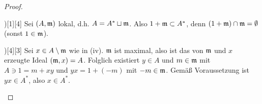 \begin{st}
\begin{proof}
\begin{seg}{\ProofImplication)[1][4]}
            Sei $(A, \mathfrak{m})$ lokal, d.h. $A = A^* \sqcup \mathfrak{m}$.
            Also $1 + \mathfrak{m} \subset A^*$, denn $(1 + \mathfrak{m}) \cap \mathfrak{m} = \emptyset$ (sonst $1 \in \mathfrak{m}$).
        \end{seg}
        \begin{seg}{\ProofImplication)[4][3]}
            Sei $x \in A \setminus \mathfrak{m}$ wie in (iv).
            $\mathfrak{m}$ ist maximal, also ist das von $\mathfrak{m}$ und $x$ erzeugte Ideal $(\mathfrak{m}, x) = A$.
            Folglich existiert $y \in A$ und $m \in \mathfrak{m}$ mit $A \ni 1 = m + xy$ und $yx = 1 + (-m)$ mit $-m \in \mathfrak{m}$.
            Gemäß Voraussetzung ist $yx \in A^*$, also $x \in A^*$.
        \end{seg}
    \end{proof}
\end{st}

